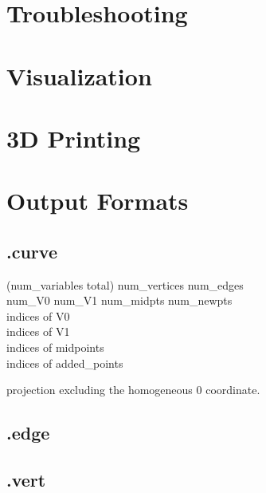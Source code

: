 \documentclass[10pt]{article}
\begin{document}
\section{Troubleshooting}

\section{Visualization}

\section{3D Printing}

\clearpage

\appendix
\section{Output Formats}


\subsection{.curve}


(num\_variables total) num\_vertices num\_edges \\
num\_V0 num\_V1 num\_midpts num\_newpts \\

indices of V0  \\
indices of V1  \\
indices of midpoints \\
indices of added\_points

projection excluding the homogeneous 0 coordinate.\\


\subsection{.edge}


\subsection{.vert}




%
%	
%	
%	
\end{document}
